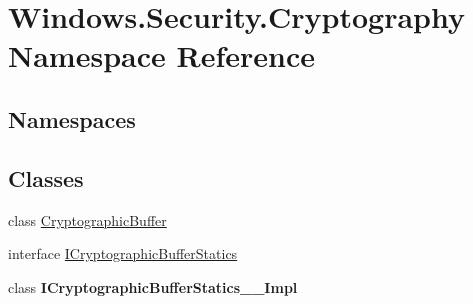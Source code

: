 \hypertarget{namespace_windows_1_1_security_1_1_cryptography}{}\section{Windows.\+Security.\+Cryptography Namespace Reference}
\label{namespace_windows_1_1_security_1_1_cryptography}
\subsection*{Namespaces}
\begin{DoxyCompactItemize}
\end{DoxyCompactItemize}
\subsection*{Classes}
\begin{DoxyCompactItemize}
\item 
class \hyperlink{class_windows_1_1_security_1_1_cryptography_1_1_cryptographic_buffer}{Cryptographic\+Buffer}
\item 
interface \hyperlink{interface_windows_1_1_security_1_1_cryptography_1_1_i_cryptographic_buffer_statics}{I\+Cryptographic\+Buffer\+Statics}
\item 
class {\bfseries I\+Cryptographic\+Buffer\+Statics\+\_\+\+\_\+\+Impl}
\end{DoxyCompactItemize}
